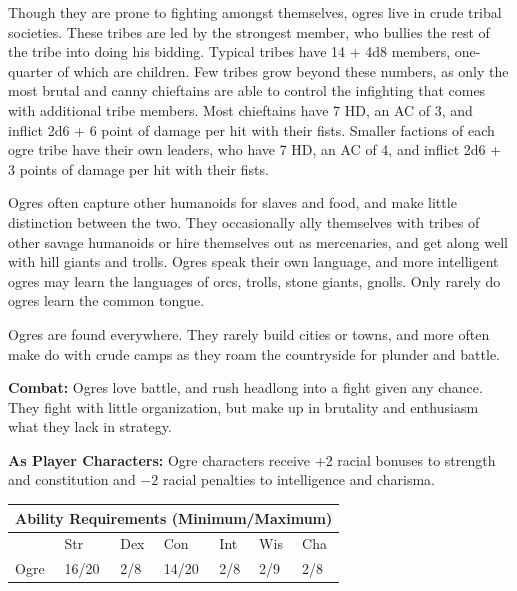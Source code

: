 \pagebreak

\begin{multicols}{2}

Though they are prone to fighting amongst themselves, ogres live in crude tribal societies. These tribes are led by the strongest member, who bullies the rest of the tribe into doing his bidding. Typical tribes have 14 + 4d8 members, one-quarter of which are children. Few tribes grow beyond these numbers, as only the most brutal and canny chieftains are able to control the infighting that comes with additional tribe members. Most chieftains have 7 HD, an AC of 3, and inflict 2d6 + 6 point of damage per hit with their fists. Smaller factions of each ogre tribe have their own leaders, who have 7 HD, an AC of 4, and inflict 2d6 + 3 points of damage per hit with their fists.

Ogres often capture other humanoids for slaves and food, and make little distinction between the two. They occasionally ally themselves with tribes of other savage humanoids or hire themselves out as mercenaries, and get along well with hill giants and trolls. Ogres speak their own language, and more intelligent ogres may learn the languages of orcs, trolls, stone giants, gnolls. Only rarely do ogres learn the common tongue.

Ogres are found everywhere. They rarely build cities or towns, and more often make do with crude camps as they roam the countryside for plunder and battle. 

\textbf{Combat:} Ogres love battle, and rush headlong into a fight given any chance. They fight with little organization, but make up in brutality and enthusiasm what they lack in strategy.

\textbf{As Player Characters:} Ogre characters receive +2 racial bonuses to strength and constitution and  $-2$ racial penalties to intelligence and charisma.

\noindent \begin{minipage}{\columnwidth}

\noindent \begin{tabular}{|p{}|p{}|p{}|p{}|p{}|p{}|p{}|}
\multicolumn{7}{c}{Ability Requirements (Minimum/Maximum)} \\
\hline
	& Str	& Dex	& Con	& Int	& Wis	& Cha	\\
\hline\hline
\rowcolor[gray]{.9}Ogre	& 16/20	& 2/8	& 14/20	& 2/8	& 2/9	& 2/8	\\
\hline
\end{tabular}


\end{minipage}
\end{multicols}
